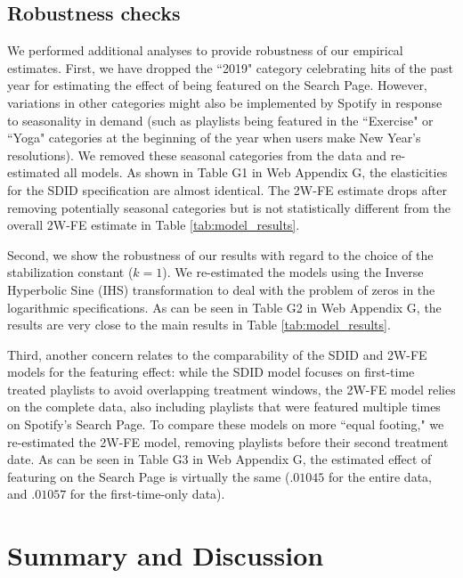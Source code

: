 \documentclass[12pt, a4paper, leqno]{article}
\begin{document}
\subsection{Robustness checks}
We performed additional analyses to provide robustness of our empirical estimates.  
First, we have dropped the ``2019" category celebrating hits of the past year for estimating the effect of being featured on the Search Page. However, variations in other categories might also be implemented by Spotify in response to seasonality in demand (such as playlists being featured in the  ``Exercise" or ``Yoga" categories at the beginning of the year when users make New Year's resolutions). We removed these seasonal categories from the data and re-estimated all models. As shown in Table G1 in Web Appendix G, the elasticities for the SDID specification are almost identical. The 2W-FE estimate drops after removing potentially seasonal categories but is not statistically different from the overall 2W-FE estimate in Table \ref{tab:model_results}. 

Second, we show the robustness of our results with regard to the choice of the stabilization constant ($k=1$). We re-estimated the models using the Inverse Hyperbolic Sine (IHS) transformation to deal with the problem of zeros in the logarithmic specifications. As can be seen in Table G2 in Web Appendix G, the results are very close to the main results in Table \ref{tab:model_results}.

Third, another concern relates to the comparability of the SDID and 2W-FE models for the featuring effect: while the SDID model focuses on first-time treated playlists to avoid overlapping treatment windows, the 2W-FE model relies on the complete data, also including playlists that were featured multiple times on Spotify's Search Page. To compare these models on more ``equal footing," we re-estimated the 2W-FE model, removing playlists before their second treatment date. As can be seen in Table G3 in Web Appendix G, the estimated effect of featuring on the Search Page is virtually the same ($.01045$ for the entire data, and $.01057$ for the first-time-only data).



\section{Summary and Discussion} 
\label{conclusion}
\end{document}

